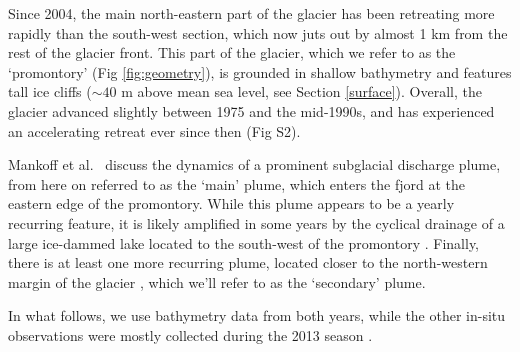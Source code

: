 \documentclass[10pt,letterpaper]{article}
\begin{document}
Since 2004, the main north-eastern part of the glacier has been retreating more rapidly than the south-west section, which now juts out by almost 1 km from the rest of the glacier front. This part of the glacier, which we refer to as the `promontory' (Fig \ref{fig:geometry}), is grounded in shallow bathymetry and features tall ice cliffs ($\sim 40$ m above mean sea level, see Section \ref{surface}). Overall, the glacier advanced slightly between 1975 and the mid-1990s, and has experienced an accelerating retreat ever since then (Fig S2). 

Mankoff et al.~\cite{Mankoff:2016jp} discuss the dynamics of a prominent subglacial discharge plume, from here on referred to as the `main' plume, which enters the fjord at the eastern edge of the promontory. While this plume appears to be a yearly recurring feature, it is likely amplified in some years by the cyclical drainage of a large ice-dammed lake located to the south-west of the promontory \citep{Kjeldsen:2017em}. Finally, there is at least one more recurring plume, located closer to the north-western margin of the glacier  \citep{Stevens:2016tx}, which we'll refer to as the `secondary' plume. 

In what follows, we use bathymetry data from both years, while the other in-situ observations were mostly collected during the 2013 season \cite[see][for further details on the field campaigns]{Stevens:2016tx, Mankoff:2016jp}.

%
\end{document}
